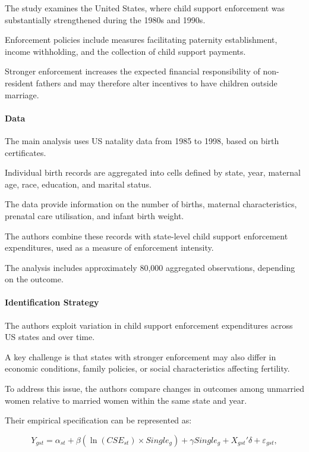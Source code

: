 \documentclass{article}
\begin{document}
The study examines the United States, where child support
enforcement was substantially strengthened during the
1980s and 1990s.

Enforcement policies include measures facilitating
paternity establishment, income withholding, and
the collection of child support payments.

Stronger enforcement increases the expected financial
responsibility of non-resident fathers and may therefore
alter incentives to have children outside marriage.

\paragraph{Data}

The main analysis uses US natality data from 1985 to 1998,
based on birth certificates.

Individual birth records are aggregated into cells
defined by state, year, maternal age, race, education,
and marital status.

The data provide information on the number of births,
maternal characteristics, prenatal care utilisation,
and infant birth weight.

The authors combine these records with state-level
child support enforcement expenditures, used as
a measure of enforcement intensity.

The analysis includes approximately 80,000
aggregated observations, depending on the outcome.

\paragraph{Identification Strategy}

The authors exploit variation in child support
enforcement expenditures across US states and over time.

A key challenge is that states with stronger enforcement
may also differ in economic conditions, family policies,
or social characteristics affecting fertility.

To address this issue, the authors compare changes
in outcomes among unmarried women relative to
married women within the same state and year.

Their empirical specification can be represented as:

\begin{equation}
Y_{gst}
=
\alpha_{st}
+
\beta
\left(
\ln(CSE_{st}) \times Single_g
\right)
+
\gamma Single_g
+
X_{gst}'\delta
+
\varepsilon_{gst},
\end{equation}
\end{document}
